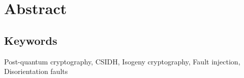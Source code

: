 \chapter*{Abstract}
\noindent
{}
\section*{Keywords}
\noindent
Post-quantum cryptography, CSIDH, Isogeny cryptography, Fault injection, Disorientation faults
